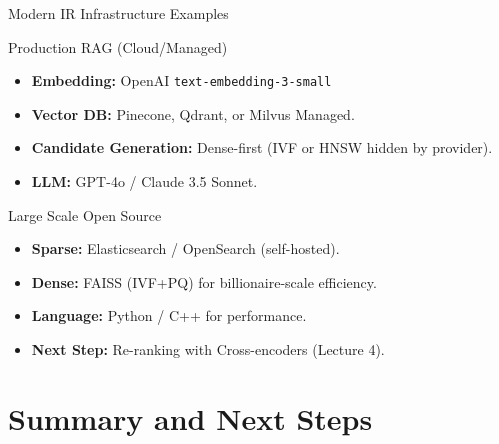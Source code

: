 \documentclass[aspectratio=169]{beamer}
\newif\ifanimated
\newcommand{\cpause}{\ifanimated\pause\fi}
\begin{document}
\begin{frame}[shrink=20]{Modern IR Infrastructure Examples}
\begin{block}{Production RAG (Cloud/Managed)}
\begin{itemize}
    \item \textbf{Embedding:} OpenAI \texttt{text-embedding-3-small}
    \item \textbf{Vector DB:} Pinecone, Qdrant, or Milvus Managed.
    \item \textbf{Candidate Generation:} Dense-first (IVF or HNSW hidden by provider).
    \item \textbf{LLM:} GPT-4o / Claude 3.5 Sonnet.
\end{itemize}
\end{block}
\cpause

\begin{block}{Large Scale Open Source}
\begin{itemize}
    \item \textbf{Sparse:} Elasticsearch / OpenSearch (self-hosted).
    \item \textbf{Dense:} FAISS (IVF+PQ) for billionaire-scale efficiency.
    \item \textbf{Language:} Python / C++ for performance.
    \item \textbf{Next Step:} Re-ranking with Cross-encoders (Lecture 4).
\end{itemize}
\end{block}
\cpause
\end{frame}



\section{Summary and Next Steps}
\end{document}
